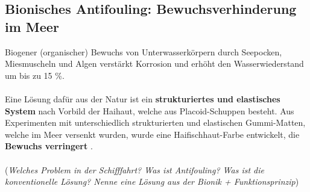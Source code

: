 \subsection{Bionisches Antifouling: Bewuchsverhinderung im Meer}

Biogener (organischer) Bewuchs von Unterwasserkörpern durch Seepocken, Miesmuscheln und Algen verstärkt Korrosion und erhöht den Wasserwiederstand um bis zu 15 \%.
\\\\
Eine Lösung dafür aus der Natur ist ein \textbf{strukturiertes und elastisches System} nach Vorbild der Haihaut, welche aus Placoid-Schuppen besteht. Aus Experimenten mit unterschiedlich strukturierten und elastischen Gummi-Matten, welche im Meer versenkt wurden, wurde eine Haifischhaut-Farbe entwickelt, die \textbf{Bewuchs verringert} \dangersign.
\\\\
(\dangersign \textit{Welches Problem in der Schifffahrt? Was ist Antifouling? Was ist die konventionelle Lösung? Nenne eine Lösung aus der Bionik + Funktionsprinzip})










